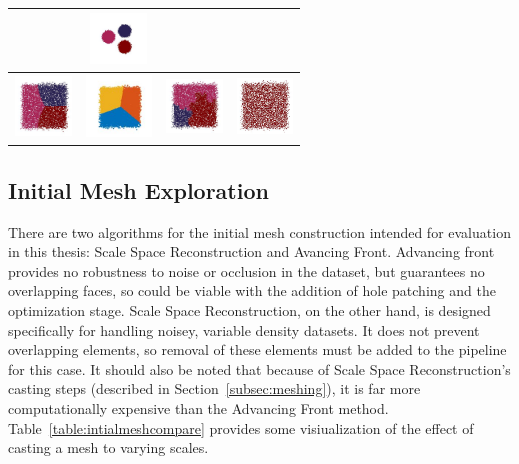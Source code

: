 \documentclass[12pt]{drexelthesis}
\let\Oldsubsection\subsection
\renewcommand{\subsection}{\FloatBarrier\Oldsubsection}
\begin{document}
\begin{table}[!ht]
\begin{tabular}{ | c | c | c | c | }
      &
            \includegraphics[width=1.5cm]{2d-cluster-tests/euclidean-distance/solid_circles.jpg}
      \\ \hline
      
            \includegraphics[width=1.5cm]{2d-cluster-tests/k-means/plane.jpg}
      & 
            \includegraphics[trim={0 0cm 0 0.25cm},clip,width=1.75cm]{2d-cluster-tests/fcm/plane.jpg}
      & 
            \includegraphics[width=1.5cm]{2d-cluster-tests/agglomerative/plane.jpg}
    
      &
            \includegraphics[width=1.5cm]{2d-cluster-tests/euclidean-distance/plane.jpg}
      \\ \hline
      
	  \end{tabular}
	  \label{table:segcomparison}
      \end{table}

\subsection{Initial Mesh Exploration}

There are two algorithms for the initial mesh construction intended for evaluation in this thesis: Scale Space Reconstruction and Avancing Front. Advancing front provides no robustness to noise or occlusion in the dataset, but guarantees no overlapping faces, so could be viable with the addition of hole patching and the optimization stage. Scale Space Reconstruction, on the other hand, is designed specifically for handling noisey, variable density datasets. It does not prevent overlapping elements, so removal of these elements must be added to the pipeline for this case. It should also be noted that because of Scale Space Reconstruction's casting steps (described in Section~\ref{subsec:meshing}), it is far more computationally expensive than the Advancing Front method. Table~\ref{table:intialmeshcompare} provides some visiualization of the effect of casting a mesh to varying scales.
\end{document}
